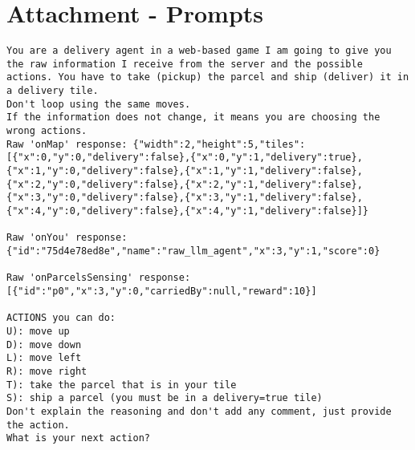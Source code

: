 \chapter{Attachment - Prompts}
\label{cha:attachment}
\begin{codewindow}
  [Prompt]  \begin{lstlisting}
You are a delivery agent in a web-based game I am going to give you the raw information I receive from the server and the possible actions. You have to take (pickup) the parcel and ship (deliver) it in a delivery tile.
Don't loop using the same moves.
If the information does not change, it means you are choosing the wrong actions.
Raw 'onMap' response: {"width":2,"height":5,"tiles":[{"x":0,"y":0,"delivery":false},{"x":0,"y":1,"delivery":true},{"x":1,"y":0,"delivery":false},{"x":1,"y":1,"delivery":false},{"x":2,"y":0,"delivery":false},{"x":2,"y":1,"delivery":false},{"x":3,"y":0,"delivery":false},{"x":3,"y":1,"delivery":false},{"x":4,"y":0,"delivery":false},{"x":4,"y":1,"delivery":false}]}

Raw 'onYou' response: {"id":"75d4e78ed8e","name":"raw_llm_agent","x":3,"y":1,"score":0}

Raw 'onParcelsSensing' response: [{"id":"p0","x":3,"y":0,"carriedBy":null,"reward":10}]

ACTIONS you can do:
U): move up
D): move down
L): move left
R): move right
T): take the parcel that is in your tile
S): ship a parcel (you must be in a delivery=true tile)
Don't explain the reasoning and don't add any comment, just provide the action.
What is your next action?
\end{lstlisting}
\end{codewindow}
\clearpage

